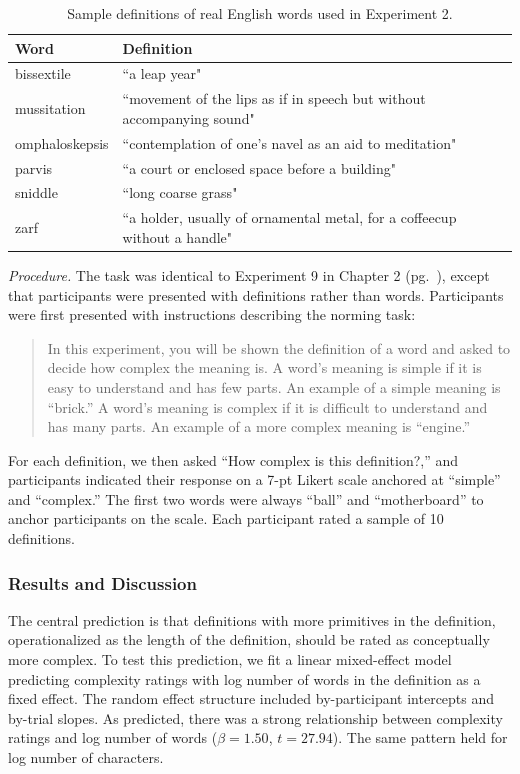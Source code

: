 \begin{table}[t!]
\centering

\begin{tabular}{ll}
\toprule
\textbf{Word} & \textbf{Definition}                \\
\toprule
   bissextile & ``a leap year"\\
   mussitation  &  \multicolumn{1}{p{12cm}}{ ``movement of the lips as if in speech but without accompanying sound"}    \\
   omphaloskepsis  &  \multicolumn{1}{p{12cm}}{ ``contemplation of one's navel as an aid to meditation"}                  \\
   parvis    &  \multicolumn{1}{p{12cm}}{ ``a court or enclosed space before a building"}                               \\
   sniddle      &  \multicolumn{1}{p{12cm}}{ ``long coarse grass"}     \\
   zarf     & \multicolumn{1}{p{12cm}}{ ``a holder, usually of ornamental metal, for a coffeecup without a handle"}                                 \\

 \bottomrule
\end{tabular}
\caption{Sample definitions of real English words used in Experiment 2.}
\label{tab:sample_word_defs}
\end{table}


{\it Procedure.} 
The task was identical to Experiment 9 in Chapter 2 (pg.\ \pageref{ch2-9}), except that participants were presented with definitions rather than words. Participants were first presented with instructions describing the norming task:
\begin{quote}
In this experiment, you will be shown the definition of a word and asked to decide how complex the meaning is. A word's meaning is simple if it is easy to understand and has few parts. An example of a simple meaning is ``brick.'' A word's meaning is complex if it is difficult to understand and has many parts. An example of a more complex meaning is ``engine.''
\end{quote}
For each definition, we then asked ``How complex is this definition?,'' and participants indicated their response on a 7-pt Likert scale anchored at ``simple'' and ``complex.'' The first two words were always ``ball'' and ``motherboard'' to anchor participants on the scale. Each participant rated a sample of 10 definitions. 

\subsubsection{Results and Discussion}
The central prediction is that definitions with more primitives in the definition, operationalized as the length of the definition, should be rated as conceptually more complex. To test this prediction, we fit a linear mixed-effect model predicting complexity ratings with log number of words in the definition as a fixed effect. The random effect structure included by-participant intercepts and by-trial slopes. As predicted, there was a strong relationship between complexity ratings and log number of words ($\beta=1.50$, $t =27.94$). The same pattern held for log number of characters.

